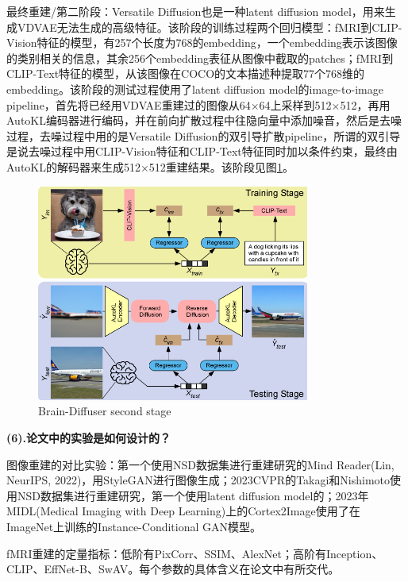 \documentclass[12pt, a4paper, oneside]{ctexart}
\begin{document}
    最终重建/第二阶段：Versatile Diffusion也是一种latent diffusion model，用来生成VDVAE无法生成的高级特征。该阶段的训练过程两个回归模型：fMRI到CLIP-Vision特征的模型，有257个长度为768的embedding，一个embedding表示该图像的类别相关的信息，其余256个embedding表征从图像中截取的patches；fMRI到CLIP-Text特征的模型，从该图像在COCO的文本描述种提取77个768维的embedding。该阶段的测试过程使用了latent diffusion model的image-to-image pipeline，首先将已经用VDVAE重建过的图像从64×64上采样到512×512，再用AutoKL编码器进行编码，并在前向扩散过程中往隐向量中添加噪音，然后是去噪过程，去噪过程中用的是Versatile Diffusion的双引导扩散pipeline，所谓的双引导是说去噪过程中用CLIP-Vision特征和CLIP-Text特征同时加以条件约束，最终由AutoKL的解码器来生成512×512重建结果。该阶段见图\ref{brain-diffuser second stage}。

    \begin{figure}[htbp]
        \centering
        \includegraphics[width=0.8\textwidth]{pic/4.4_second stage.png}
        \caption{Brain-Diffuser second stage}
        \label{brain-diffuser second stage}
    \end{figure}

    \noindent\textbf{(6).论文中的实验是如何设计的？}

    图像重建的对比实验：第一个使用NSD数据集进行重建研究的Mind Reader(Lin, NeurIPS, 2022)，用StyleGAN进行图像生成；2023CVPR的Takagi和Nishimoto使用NSD数据集进行重建研究，第一个使用latent diffusion model的；2023年MIDL(Medical Imaging with Deep Learning)上的Cortex2Image使用了在ImageNet上训练的Instance-Conditional GAN模型。

    fMRI重建的定量指标：低阶有PixCorr、SSIM、AlexNet；高阶有Inception、CLIP、EffNet-B、SwAV。每个参数的具体含义在论文中有所交代。
\end{document}
